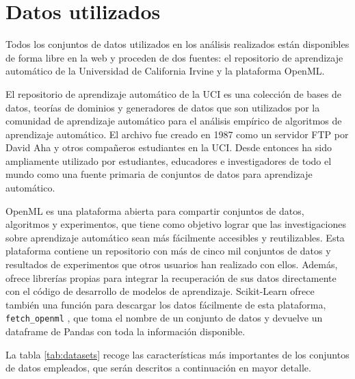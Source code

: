 \section{Datos utilizados}
\label{sec:datasets}

Todos los conjuntos de datos utilizados en los análisis realizados están disponibles de forma libre en la web y proceden de dos fuentes: el repositorio de aprendizaje automático de la Universidad de California Irvine y la plataforma OpenML.

El repositorio de aprendizaje automático de la UCI \cite{ml-uci} es una colección de bases de datos, teorías de dominios y generadores de datos que son utilizados por la comunidad de aprendizaje automático para el análisis empírico de algoritmos de aprendizaje automático. El archivo fue creado en 1987 como un servidor FTP por David Aha y otros compañeros estudiantes en la UCI. Desde entonces ha sido ampliamente utilizado por estudiantes, educadores e investigadores de todo el mundo como una fuente primaria de conjuntos de datos para aprendizaje automático.

OpenML \cite{openml} es una plataforma abierta para compartir conjuntos de datos, algoritmos y experimentos, que tiene como objetivo lograr que las investigaciones sobre aprendizaje automático sean más fácilmente accesibles y reutilizables. Esta plataforma contiene un repositorio con más de cinco mil conjuntos de datos y resultados de experimentos que otros usuarios han realizado con ellos. Además, ofrece librerías propias para integrar la recuperación de sus datos directamente con el código de desarrollo de modelos de aprendizaje. Scikit-Learn ofrece también una función para descargar los datos fácilmente de esta plataforma, \texttt{fetch\_openml} \cite{sk-fetch-openml}, que toma el nombre de un conjunto de datos y devuelve un dataframe de Pandas con toda la información disponible.

La tabla \ref{tab:datasets} recoge las características más importantes de los conjuntos de datos empleados, que serán descritos a continuación en mayor detalle.

